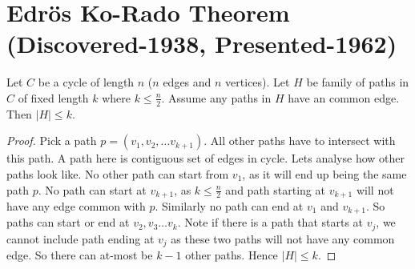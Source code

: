 \section{Edr{\"o}s Ko-Rado Theorem (Discovered-1938, Presented-1962)}
\begin{lemma} Let $C$ be a cycle of length $n$ ($n$ edges and $n$ vertices). Let $H$ be family of paths in $C$ of fixed length $k$ where $k\le \frac{n}{2}$. Assume any paths in $H$ have an common edge. Then $|H|\le k$.
\begin{proof}Pick a path $p = (v_1, v_2, \hdots v_{k+1})$. All other paths have to intersect with this path. A path here is contiguous set of edges in cycle. Lets analyse how other paths look like. No other path can start from $v_1$, as it will end up being the same path $p$. No path can start at $v_{k+1}$, as $k\le \frac{n}{2}$ and path starting at $v_{k+1}$ will not have any edge common with $p$. Similarly no path can end at $v_1$ and $v_{k+1}$. So paths can start or end at $v_2, v_3 \hdots v_{k}$. Note if there is a path that starts at $v_j$, we cannot include path ending at $v_j$ as these two paths will not have any common edge. So there can at-most be $k-1$ other paths. Hence $|H|\le k$.
\end{proof}
\end{lemma}

